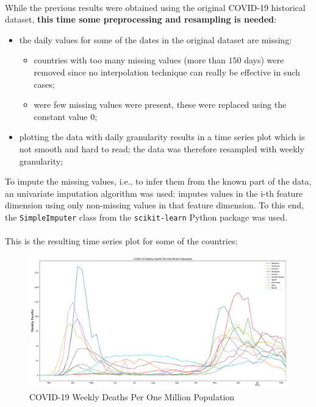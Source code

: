 \documentclass[11pt,a4paper]{article}
\begin{document}
\\
While the previous results were obtained using the original COVID-19 historical
dataset\cite{ourworldindata}, \textbf{this time some preprocessing and
resampling is needed}:
\begin{itemize}
    \item the daily values for some of the dates in the original dataset are missing:
    \begin{itemize}
        \item countries with too many missing values (more than $150$ days) were
        removed since no interpolation technique can really be effective in such
        cases;
        \item were few missing values were present, these were replaced using
        the constant value $0$;
    \end{itemize}
    \item plotting the data with daily granularity results in a time series plot
    which is not smooth and hard to read; the data was therefore resampled with
    weekly granularity;
\end{itemize}
To impute the missing values, i.e., to infer them from the known part of the
data, an univariate imputation algorithm was used: imputes values in the
i-th feature dimension using only non-missing values in that feature dimension.
To this end, the \texttt{SimpleImputer} class from the \texttt{scikit-learn}
Python package was used.\\
\\
This is the resulting time series plot for some of the countries:
\begin{figure}[H]
    \begin{center}
        \hspace*{-0.3cm}
        \includegraphics[scale=0.325]{img/weekly-deaths-per-million.pdf}
    \end{center}
    \vspace{-0.2cm}
    \caption{COVID-19 Weekly Deaths Per One Million Population}
\end{figure}
\end{document}
